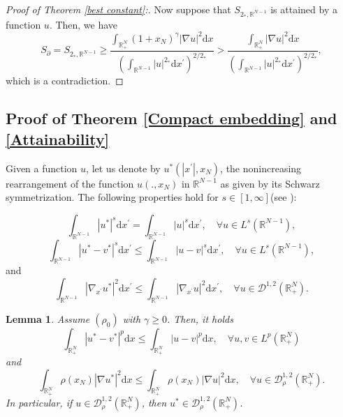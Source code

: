 \documentclass[12pt,reqno]{amsart}
\newtheorem{lemma}[theorem]{Lemma}
\begin{document}
\begin{proof}[Proof of Theorem \ref{best constant}:]
Now suppose that $S_{2_\ast,\mathds{R}^{N-1}}$ is attained by a function $u$. Then, we have
\[
 S_\partial= S_{2_\ast,\mathds{R}^{N-1}}\geq   \frac{\int_{\mathds{R}^N_+}(1+x_N)^\gamma|\nabla u|^2\mathrm{d}x}{\left(\int_{\mathds{R}^{N-1}}|u|^{2_\ast}\mathrm{d}x^\prime\right)^{2/2_\ast}}>  \frac{\int_{\mathds{R}^N_+}|\nabla u|^2\mathrm{d}x}{\left(\int_{\mathds{R}^{N-1}}|u|^{2_\ast}\mathrm{d}x^\prime\right)^{2/2_\ast}},
\]
which is a contradiction.
\end{proof}

\bigskip
\subsection{Proof of Theorem \ref{Compact embedding} and \ref{Attainability}} 

Given a function $u$, let us denote by $u^\ast(|x^\prime|, x_N)$, the nonincreasing rearrangement of the function $u(., x_N)$ in $\mathds{R}^{N-1}$ as given by its Schwarz symmetrization. The following properties hold for $s\in[1,\infty]$(see \cite{Badiale-Tarantello, Kawohl, PLLions}):

\begin{equation}\label{Property i}
 \int_{\mathds{R}^{N-1}}|u^\ast|^s\mathrm{d}x^\prime=\int_{\mathds{R}^{N-1}}|u|^s\mathrm{d}x^\prime, \quad\forall u \in L^s(\mathds{R}^{N-1}),
 \end{equation}
 \begin{equation}\label{Property ii}
  \int_{\mathds{R}^{N-1}}|u^\ast-v^\ast|^s\mathrm{d}x^\prime\leq \int_{\mathds{R}^{N-1}}|u-v|^s\mathrm{d}x^\prime, \quad\forall u \in L^s(\mathds{R}^{N-1}),
\end{equation}   
and
\begin{equation}\label{Property iii}     
     \int_{\mathds{R}^{N-1}}|\nabla_{x^\prime} u^\ast|^2\mathrm{d}x^\prime\leq \int_{\mathds{R}^{N-1}}|\nabla_{x^\prime} u|^2\mathrm{d}x^\prime,\quad\forall u \in \mathcal{D}^{1,2}(\mathds{R}^N_+).
\end{equation}

	\begin{lemma}\label{Lemma-Simetria}Assume $(\rho_0)$ with $\gamma\geq 0$. Then, it holds
    \begin{equation}\label{Lp sym}
        \int_{\mathds{R}^N_+}|u^\ast-v^\ast|^p\mathrm{d}x\leq \int_{\mathds{R}^N_+}|u-v|^p\mathrm{d}x,\quad \text{$\forall u,v\in L^p(\mathds{R}^N_+)$}
    \end{equation}
and    
	\begin{equation}\label{symmetrization}
			\int_{\mathds{R}^N_+}\rho(x_N)|\nabla u^\ast|^2\mathrm{d}x\leq \int_{\mathds{R}^{N}_+}\rho(x_N)|\nabla u|^2\mathrm{d}x,\quad \forall u\in \mathcal{D}^{1,2}_\rho(\mathds{R}^N_+).
		\end{equation}
In particular, if $u \in \mathcal{D}^{1,2}_\rho(\mathds{R}^N_+)$, then $u^\ast \in \mathcal{D}^{1,2}_\rho(\mathds{R}^N_+)$.        
	\end{lemma}
	
\end{document}
